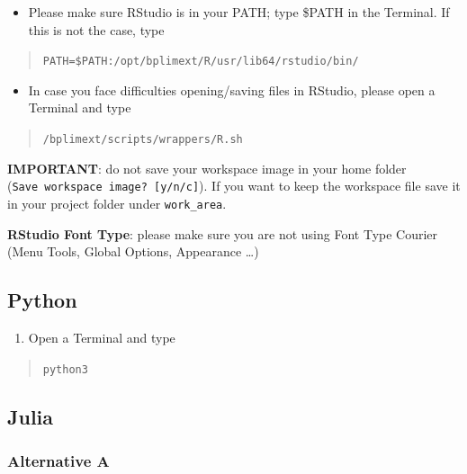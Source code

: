 \documentclass[
  11pt,
  a4paper,
]{article}
\providecommand{\tightlist}{%
  \setlength{\itemsep}{0pt}\setlength{\parskip}{0pt}}
\begin{document}
\begin{itemize}
\tightlist
\item
  Please make sure RStudio is in your PATH; type \$PATH in the Terminal.
  If this is not the case, type
\end{itemize}

\begin{quote}
\texttt{PATH=\$PATH:/opt/bplimext/R/usr/lib64/rstudio/bin/}
\end{quote}

\begin{itemize}
\tightlist
\item
  In case you face difficulties opening/saving files in RStudio, please
  open a Terminal and type
\end{itemize}

\begin{quote}
\texttt{/bplimext/scripts/wrappers/R.sh}
\end{quote}

\textbf{IMPORTANT}: do not save your workspace image in your home folder
(\texttt{Save\ workspace\ image?\ {[}y/n/c{]}}). If you want to keep the
workspace file save it in your project folder under \texttt{work\_area}.

\textbf{RStudio Font Type}: please make sure you are not using Font Type
Courier (Menu Tools, Global Options, Appearance \ldots)

\hypertarget{python}{%
\subsection{Python}\label{python}}

\begin{enumerate}
\def\labelenumi{\arabic{enumi}.}
\tightlist
\item
  Open a Terminal and type
\end{enumerate}

\begin{quote}
\texttt{python3}
\end{quote}

\hypertarget{julia}{%
\subsection{Julia}\label{julia}}

\hypertarget{alternative-a}{%
\subsubsection{Alternative A}\label{alternative-a}}
\end{document}
